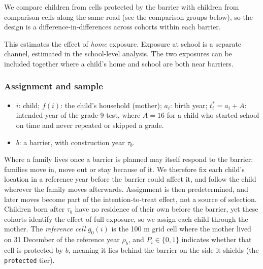 \documentclass[11pt]{article}
\begin{document}
We compare children from cells protected by the barrier with children from comparison cells along the same road (see the comparison groups below), so the design is a difference-in-differences across cohorts within each barrier.

This estimates the effect of \emph{home} exposure. Exposure at school is a separate channel, estimated in the school-level analysis. The two exposures can be included together where a child's home and school are both near barriers.

\subsubsection{Assignment and sample}

\begin{itemize}
\item \(i\): child; \(f(i)\): the child's household (mother); \(a_i\): birth year; \(t^*_i = a_i + A\): intended year of the grade-9 test, where \(A = 16\) for a child who started school on time and never repeated or skipped a grade.
\item \(b\): a barrier, with construction year \(\tau_b\).
\end{itemize}

Where a family lives once a barrier is planned may itself respond to the barrier: families move in, move out or stay because of it. We therefore fix each child's location in a reference year before the barrier could affect it, and follow the child wherever the family moves afterwards. Assignment is then predetermined, and later moves become part of the intention-to-treat effect, not a source of selection. Children born after \(\tau_b\) have no residence of their own before the barrier, yet these cohorts identify the effect of full exposure, so we assign each child through the mother. The \emph{reference cell} \(g_0(i)\) is the 100 m grid cell where the mother lived on 31 December of the reference year \(\rho_b\), and \(P_i \in \{0,1\}\) indicates whether that cell is protected by \(b\), meaning it lies behind the barrier on the side it shields (the \texttt{protected} tier).
\end{document}
